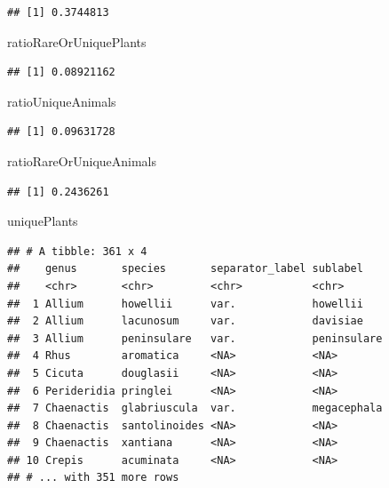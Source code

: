 \documentclass[]{article}
\newenvironment{Shaded}{\begin{snugshade}}{\end{snugshade}}
\newcommand{\NormalTok}[1]{#1}
\begin{document}
\begin{verbatim}
## [1] 0.3744813
\end{verbatim}

\begin{Shaded}
\begin{Highlighting}[]
\NormalTok{ratioRareOrUniquePlants}
\end{Highlighting}
\end{Shaded}

\begin{verbatim}
## [1] 0.08921162
\end{verbatim}

\begin{Shaded}
\begin{Highlighting}[]
\NormalTok{ratioUniqueAnimals}
\end{Highlighting}
\end{Shaded}

\begin{verbatim}
## [1] 0.09631728
\end{verbatim}

\begin{Shaded}
\begin{Highlighting}[]
\NormalTok{ratioRareOrUniqueAnimals}
\end{Highlighting}
\end{Shaded}

\begin{verbatim}
## [1] 0.2436261
\end{verbatim}

\begin{Shaded}
\begin{Highlighting}[]
\NormalTok{uniquePlants}
\end{Highlighting}
\end{Shaded}

\begin{verbatim}
## # A tibble: 361 x 4
##    genus       species       separator_label sublabel   
##    <chr>       <chr>         <chr>           <chr>      
##  1 Allium      howellii      var.            howellii   
##  2 Allium      lacunosum     var.            davisiae   
##  3 Allium      peninsulare   var.            peninsulare
##  4 Rhus        aromatica     <NA>            <NA>       
##  5 Cicuta      douglasii     <NA>            <NA>       
##  6 Perideridia pringlei      <NA>            <NA>       
##  7 Chaenactis  glabriuscula  var.            megacephala
##  8 Chaenactis  santolinoides <NA>            <NA>       
##  9 Chaenactis  xantiana      <NA>            <NA>       
## 10 Crepis      acuminata     <NA>            <NA>       
## # ... with 351 more rows
\end{verbatim}
\end{document}
